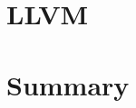 \section{LLVM}
\label{sec:llvm}


\section{Summary}
\label{sec:related_summary}


% 


% 

\clearpage



